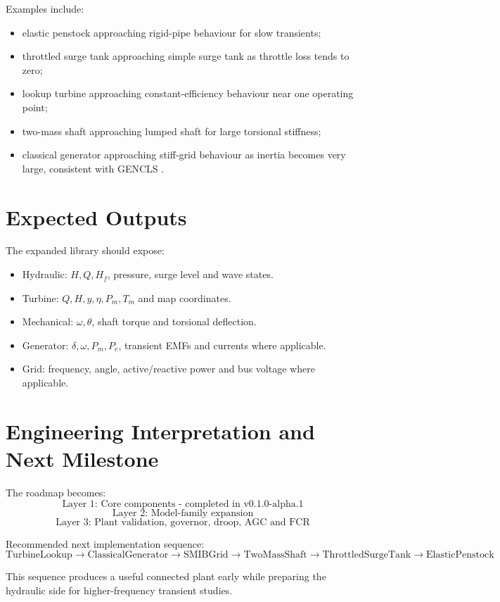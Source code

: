 \documentclass[10pt,a4paper]{article}
\begin{document}
Examples include:
\begin{itemize}
\item elastic penstock approaching rigid-pipe behaviour for slow transients;
\item throttled surge tank approaching simple surge tank as throttle loss tends to zero;
\item lookup turbine approaching constant-efficiency behaviour near one operating point;
\item two-mass shaft approaching lumped shaft for large torsional stiffness;
\item classical generator approaching stiff-grid behaviour as inertia becomes very large, consistent with GENCLS \cite{GENCLS}.
\end{itemize}

\section{Expected Outputs}
The expanded library should expose:
\begin{itemize}
\item Hydraulic: $H,Q,H_f$, pressure, surge level and wave states.
\item Turbine: $Q,H,y,\eta,P_m,T_m$ and map coordinates.
\item Mechanical: $\omega,\theta$, shaft torque and torsional deflection.
\item Generator: $\delta,\omega,P_m,P_e$, transient EMFs and currents where applicable.
\item Grid: frequency, angle, active/reactive power and bus voltage where applicable.
\end{itemize}

\section{Engineering Interpretation and Next Milestone}
The roadmap becomes:
\[
\boxed{\text{Layer 1: Core components - completed in v0.1.0-alpha.1}}
\]
\[
\boxed{\text{Layer 2: Model-family expansion}}
\]
\[
\boxed{\text{Layer 3: Plant validation, governor, droop, AGC and FCR}}
\]

Recommended next implementation sequence:
\[
\boxed{
\text{TurbineLookup}\rightarrow
\text{ClassicalGenerator}\rightarrow
\text{SMIBGrid}\rightarrow
\text{TwoMassShaft}\rightarrow
\text{ThrottledSurgeTank}\rightarrow
\text{ElasticPenstock}
}
\]

This sequence produces a useful connected plant early while preparing the hydraulic side for higher-frequency transient studies.
\end{document}
